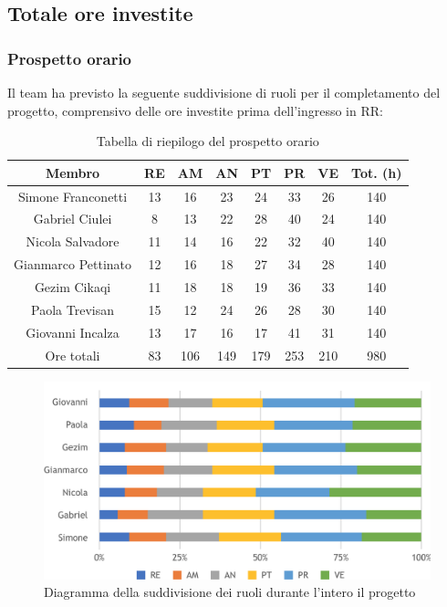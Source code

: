 \subsection{Totale ore investite}
\subsubsection{Prospetto orario}
Il team ha previsto la seguente suddivisione di ruoli per il completamento del progetto, comprensivo delle ore investite prima dell'ingresso in RR:
\begin{table}[h]
\caption{Tabella di riepilogo del prospetto orario}
\begin{center}
\begin{tabular}{ |c|c|c|c|c|c|c|c|  }
 \hline
 Membro 		& RE 		& AM 		& AN 	& PT 	& PR 	& VE 	& Tot. (h)\\
 \hline\hline
 Simone	Franconetti		& 13 		& 16			& 23 		& 24 		& 33 		& 26 		& 140\\
 Gabriel Ciulei		& 8 			& 13 		& 22 		& 28		& 40 		& 24 		& 140\\
 Nicola	Salvadore		& 11 		& 14 		& 16 		& 22 		& 32 		& 40 		& 140\\
 Gianmarco Pettinato		& 12 		& 16 		& 18 		& 27	 	& 34 		& 28 		& 140\\
 Gezim Cikaqi		& 11 		& 18 		& 18 		& 19 		& 36 		& 33	 	& 140\\
 Paola Trevisan		& 15 		& 12 		& 24 		& 26 		& 28 		& 30 		& 140\\
 Giovanni	Incalza	& 13 		& 17	 		& 16 		& 17 		& 41	 	& 31  		& 140\\
 \hline\hline
 Ore totali		& 83 	& 106		& 149 	& 179 	& 253 	& 210 	& 980\\
  \hline
\end{tabular}
\end{center}
\end{table}
\begin{figure}[h!]
	\includegraphics[width=\textwidth]{res/img/hip3}
	\caption{Diagramma della suddivisione dei ruoli durante l'intero il progetto}
\end{figure}

